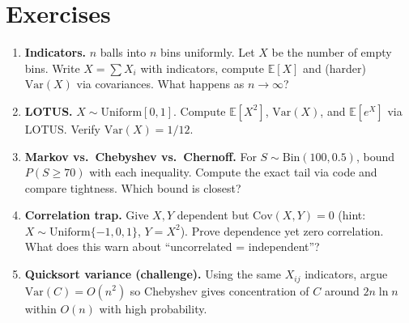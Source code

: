 \section{Exercises}
\label{sec:ch05-exercises}
\begin{enumerate}[label=E5.\arabic*, leftmargin=*, itemsep=0.8em]
\item \textbf{Indicators.} $n$ balls into $n$ bins uniformly. Let $X$ be the number of empty bins. Write $X=\sum X_i$ with indicators, compute $\mathbb{E}[X]$ and (harder) $\mathrm{Var}(X)$ via covariances. What happens as $n\to\infty$?
\item \textbf{LOTUS.} $X\sim\mathrm{Uniform}[0,1]$. Compute $\mathbb{E}[X^2]$, $\mathrm{Var}(X)$, and $\mathbb{E}[e^X]$ via LOTUS. Verify $\mathrm{Var}(X)=1/12$.
\item \textbf{Markov vs.\ Chebyshev vs.\ Chernoff.} For $S\sim\mathrm{Bin}(100,0.5)$, bound $P(S\ge70)$ with each inequality. Compute the exact tail via code and compare tightness. Which bound is closest?
\item \textbf{Correlation trap.} Give $X,Y$ dependent but $\mathrm{Cov}(X,Y)=0$ (hint: $X\sim\mathrm{Uniform}\{-1,0,1\}$, $Y=X^2$). Prove dependence yet zero correlation. What does this warn about ``uncorrelated = independent''?
\item \textbf{Quicksort variance (challenge).} Using the same $X_{ij}$ indicators, argue $\mathrm{Var}(C)=O(n^2)$ so Chebyshev gives concentration of $C$ around $2n\ln n$ within $O(n)$ with high probability.
\end{enumerate}
